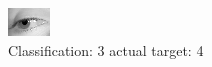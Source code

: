 \begin{figure}[h!]
\begin{center}
\includegraphics[width=0.60\columnwidth]{figures/ID2981_class_3_target_4.png}
\end{center}
\caption{ Classification: 3 actual target: 4}
\label{fig:ID2981_class_3_target_4}
\end{figure}
